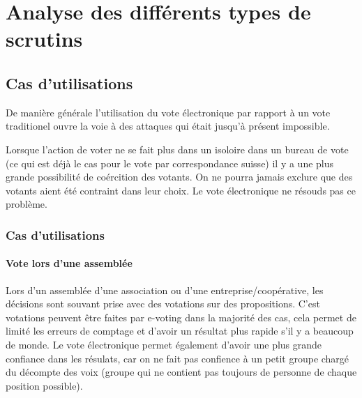 \documentclass[../report]{subfiles}
\begin{document}
\newcommand\tabcritere[8]{
  \begin{center}
    \begin{tabular}{r|c|p{20em}}
      \hline
      Critère & Évaluation & Raison \\
      \hline
      \hline
      Avis des perdants & #1 & #2 \\
      \hline
      Indépendance aux petits candidats & #3 & #4 \\
      \hline
      Quasi unanimité du vote & #5 & #6 \\
      \hline
      Manipulabilité & #7 & #8 \\
      \hline
    \end{tabular}
  \end{center}
}



  \part{Analyse des différents types de scrutins}

\chapter{Cas d'utilisations}

De manière générale l'utilisation du vote électronique par rapport à un vote traditionel ouvre la voie à 
des attaques qui était jusqu'à présent impossible. 

Lorsque l'action de voter ne se fait plus dans un isoloire dans un bureau de vote (ce qui est déjà le cas
pour le vote par correspondance suisse) il y a une plus grande possibilité de coércition des votants.
On ne pourra jamais exclure que des votants aient été contraint dans leur choix. 
Le vote électronique ne résouds pas ce problème.

\section{Cas d'utilisations}
\subsection{Vote lors d'une assemblée}

Lors d'un assemblée d'une association ou d'une entreprise/coopérative, les décisions sont souvant prise avec
des votations sur des propositions.
C'est votations peuvent être faites par e-voting dans la majorité des cas, cela permet de limité les erreurs 
de comptage et d'avoir un résultat plus rapide s'il y a beaucoup de monde.
Le vote électronique permet également d'avoir une plus grande confiance dans les résulats, car on ne fait pas 
confience à un petit groupe chargé du décompte des voix (groupe qui ne contient pas toujours de personne de 
chaque position possible).
\end{document}
